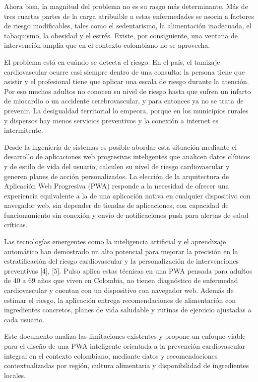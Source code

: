 \documentclass[conference]{IEEEtran}
\begin{document}
Ahora bien, la magnitud del problema no es su rasgo más determinante. Más de tres cuartas partes de la carga atribuible a estas enfermedades se asocia a factores de riesgo modificables, tales como el sedentarismo, la alimentación inadecuada, el tabaquismo, la obesidad y el estrés. Existe, por consiguiente, una ventana de intervención amplia que en el contexto colombiano no se aprovecha.

El problema está en cuándo se detecta el riesgo. En el país, el tamizaje cardiovascular ocurre casi siempre dentro de una consulta: la persona tiene que asistir y el profesional tiene que aplicar una escala de riesgo durante la atención. Por eso muchos adultos no conocen su nivel de riesgo hasta que sufren un infarto de miocardio o un accidente cerebrovascular, y para entonces ya no se trata de prevenir. La desigualdad territorial lo empeora, porque en los municipios rurales y dispersos hay menos servicios preventivos y la conexión a internet es intermitente.

Desde la ingeniería de sistemas es posible abordar esta situación mediante el desarrollo de aplicaciones web progresivas inteligentes que analicen datos clínicos y de estilo de vida del usuario, calculen su nivel de riesgo cardiovascular y generen planes de acción personalizados. La elección de la arquitectura de Aplicación Web Progresiva (PWA) responde a la necesidad de ofrecer una experiencia equivalente a la de una aplicación nativa en cualquier dispositivo con navegador web, sin depender de tiendas de aplicaciones, con capacidad de funcionamiento sin conexión y envío de notificaciones push para alertas de salud críticas.

Las tecnologías emergentes como la inteligencia artificial y el aprendizaje automático han demostrado un alto potencial para mejorar la precisión en la estratificación del riesgo cardiovascular y la personalización de intervenciones preventivas [4], [5]. Pulso aplica estas técnicas en una PWA pensada para adultos de 40 a 69 años que viven en Colombia, no tienen diagnóstico de enfermedad cardiovascular y cuentan con un dispositivo con navegador web. Además de estimar el riesgo, la aplicación entrega recomendaciones de alimentación con ingredientes concretos, planes de vida saludable y rutinas de ejercicio ajustadas a cada usuario.

Este documento analiza las limitaciones existentes y propone un enfoque viable para el diseño de una PWA inteligente orientada a la prevención cardiovascular integral en el contexto colombiano, mediante datos y recomendaciones contextualizadas por región, cultura alimentaria y disponibilidad de ingredientes locales.
\end{document}
